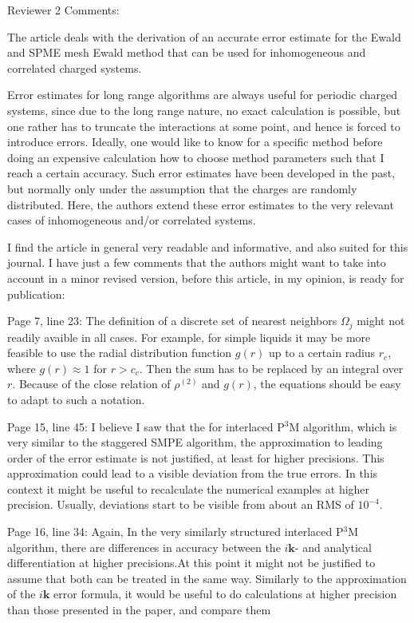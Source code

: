 \documentclass[a4paper]{article}
\begin{document}
Reviewer  2 Comments:

The article deals with the derivation of an accurate error estimate for the Ewald and SPME mesh Ewald method that can be used for inhomogeneous and correlated charged systems.

Error estimates for long range algorithms are always useful for periodic charged systems, since due to the long range nature, no exact calculation is possible, but one rather has to truncate the interactions at some point, and hence is forced to introduce errors.  Ideally, one would like to know for a specific method before doing an expensive calculation how to choose method parameters such that I reach a certain accuracy. Such error estimates have been developed in the past, but normally only under the assumption that the charges are randomly distributed. Here, the authors extend these error estimates to the very relevant cases of inhomogeneous and/or correlated systems.

I find the article in general very readable and informative, and also suited for this journal. I have just a few comments that the authors might want to take into account in a minor revised version, before this article, in my opinion, is ready for publication:

Page 7, line 23:
The definition of a discrete set of nearest neighbors $\Omega_j$ might not readily avaible in all cases. For example, for simple liquids it may be more feasible to use the radial distribution function $g(r)$ up to a certain radius $r_c$, where $g(r) \approx 1$ for $r > c_c$. Then the sum has to be replaced by an integral over $r$.  Because of the close relation of $\rho^{(2)}$ and $g(r)$, the equations should be easy to adapt to such a notation.


Page 15, line 45:
I believe I saw that the for interlaced P$^3$M algorithm, which is very similar to the staggered SMPE algorithm,  the approximation to leading order of the error estimate is not justified, at least for higher precisions. This approximation could lead to a visible deviation from the true errors. In this context it might be useful to recalculate the numerical examples at higher precision. Usually, deviations start to be visible from about an RMS of $10^{-4}$.

Page 16, line 34:
Again, In the very similarly structured interlaced P$^3$M algorithm,  there are differences in accuracy between the $i\mathbf{k}$- and analytical differentiation at higher precisions.At this point it might not be justified  to assume that both can be treated in the same way. Similarly to the approximation of the $i\mathbf{k}$ error formula, it would be useful to do calculations at higher precision than those presented in the paper, and compare them
\end{document}
